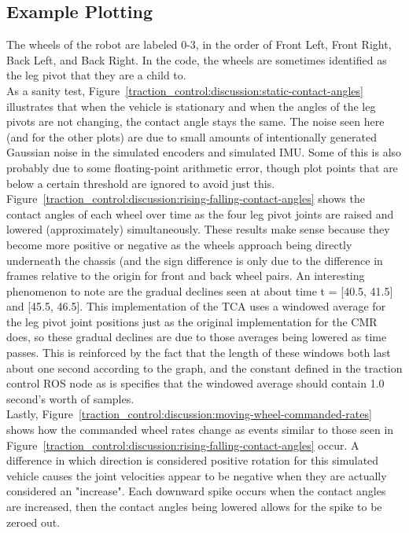 \subsection{Example Plotting}
The wheels of the robot are labeled 0-3, in the order of Front Left, Front Right, Back Left, and Back Right. In the code, the wheels are sometimes identified as the leg pivot that they are a child to. \\

As a sanity test, Figure~\ref{traction_control:discussion:static-contact-angles} illustrates that when the vehicle is stationary and when the angles of the leg pivots are not changing, the contact angle stays the same. The noise seen here (and for the other plots) are due to small amounts of intentionally generated Gaussian noise in the simulated encoders and simulated \ac{IMU}. Some of this is also probably due to some floating-point arithmetic error, though plot points that are below a certain threshold are ignored to avoid just this. \\

Figure~\ref{traction_control:discussion:rising-falling-contact-angles} shows the contact angles of each wheel over time as the four leg pivot joints are raised and lowered (approximately) simultaneously. These results make sense because they become more positive or negative as the wheels approach being directly underneath the chassis (and the sign difference is only due to the difference in frames relative to the origin for front and back wheel pairs. An interesting phenomenon to note are the gradual declines seen at about time t = [40.5, 41.5] and [45.5, 46.5]. This implementation of the \ac{TCA} uses a windowed average for the leg pivot joint positions just as the original implementation for the \ac{CMR} does, so these gradual declines are due to those averages being lowered as time passes. This is reinforced by the fact that the length of these windows both last about one second according to the graph, and the constant defined in the traction control ROS node as is specifies that the windowed average should contain 1.0 second's worth of samples. \\

Lastly, Figure~\ref{traction_control:discussion:moving-wheel-commanded-rates} shows how the commanded wheel rates change as events similar to those seen in Figure~\ref{traction_control:discussion:rising-falling-contact-angles} occur. A difference in which direction is considered positive rotation for this simulated vehicle causes the joint velocities appear to be negative when they are actually considered an "increase". Each downward spike occurs when the contact angles are increased, then the contact angles being lowered allows for the spike to be zeroed out.

